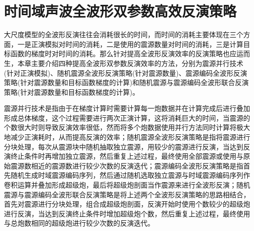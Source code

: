 \documentclass[12pt]{article}
\begin{document}
\section{时间域声波全波形双参数高效反演策略}
大尺度模型的全波形反演往往会消耗很长的时间，而时间的消耗主要体现在三个方面，一是正演模拟对时间的消耗，二是使用的震源数量对时间的消耗，三是计算目标函数的梯度时对时间的消耗。那么针对提高全波形反演效率的反演策略也应运而生，本章主要介绍四种提高全波形双参数反演效率的方法，分别为震源并行技术(针对正演模拟)、随机震源全波形反演策略(针对震源数量)、震源编码全波形反演策略(针对震源数量和目标函数梯度的计算)和随机震源与震源编码全波形联合反演策略(针对震源数量和目标函数梯度的计算)。
\par
震源并行技术是指由于在梯度计算时需要计算每一炮数据并在计算完成后进行叠加形成总体梯度，这个过程需要进行两次正演计算，这将消耗巨大的时间，当震源的个数很大时则导致反演效率很低，然而将多个炮数据使用并行方法同时计算将极大地减少正演耗时，从而提高反演的效率；随机震源全波形反演策略是指将震源进行分块处理，每次从震源块中随机抽取独立震源，用较少的震源进行反演，当达到反演终止条件时再增加独立震源，然后重复上述过程，最终使用全部震源或使用与原始震源数相近的震源数进行较少次数的反演迭代；震源编码全波形反演策略是指首先随机生成时域震源编码序列，然后通过随机选取独立震源与时域震源编码序列作卷积运算并叠加形成超级炮，最后将超级炮剖面当作震源来进行全波形反演；随机震源与震源编码全波形联合反演策略是将上述两个全波形反演策略的思路相结合，首先对震源进行分块处理，组合成超级炮剖面，反演开始时使用个数较少的超级炮进行反演，当达到反演终止条件时增加超级炮个数，然后重复上述过程，最终使用与总炮数相同的超级炮进行较少次数的反演迭代。
\end{document}
